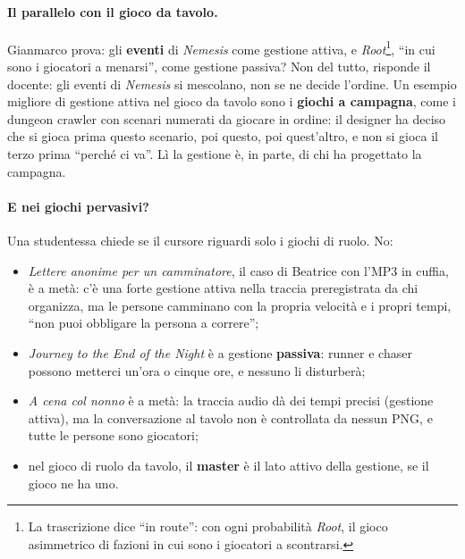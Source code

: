 \paragraph{Il parallelo con il gioco da tavolo.} Gianmarco prova: gli
\textbf{eventi} di \emph{Nemesis} come gestione attiva, e
\emph{Root}\footnote{La trascrizione dice ``in route'': con ogni probabilità
\emph{Root}, il gioco asimmetrico di fazioni in cui sono i giocatori a
scontrarsi.}, ``in cui sono i giocatori a menarsi'', come gestione passiva? Non
del tutto, risponde il docente: gli eventi di \emph{Nemesis} si mescolano, non se
ne decide l'ordine. Un esempio migliore di gestione attiva nel gioco da tavolo
sono i \textbf{giochi a campagna}, come i dungeon crawler con scenari numerati da
giocare in ordine: il designer ha deciso che si gioca prima questo scenario, poi
questo, poi quest'altro, e non si gioca il terzo prima ``perché ci va''. Lì la
gestione è, in parte, di chi ha progettato la campagna.

\paragraph{E nei giochi pervasivi?} Una studentessa chiede se il cursore
riguardi solo i giochi di ruolo. No:
\begin{itemize}
  \item \emph{Lettere anonime per un camminatore}, il caso di Beatrice con
        l'MP3 in cuffia, è a metà: c'è una forte gestione attiva nella traccia
        preregistrata da chi organizza, ma le persone camminano con la propria
        velocità e i propri tempi, ``non puoi obbligare la persona a correre'';
  \item \emph{Journey to the End of the Night} è a gestione
        \textbf{passiva}: runner e chaser possono metterci un'ora o cinque ore,
        e nessuno li disturberà;
  \item \emph{A cena col nonno} è a metà: la traccia audio dà dei tempi
        precisi (gestione attiva), ma la conversazione al tavolo non è
        controllata da nessun PNG, e tutte le persone sono giocatori;
  \item nel gioco di ruolo da tavolo, il \textbf{master} è il lato attivo della
        gestione, se il gioco ne ha uno.
\end{itemize}

